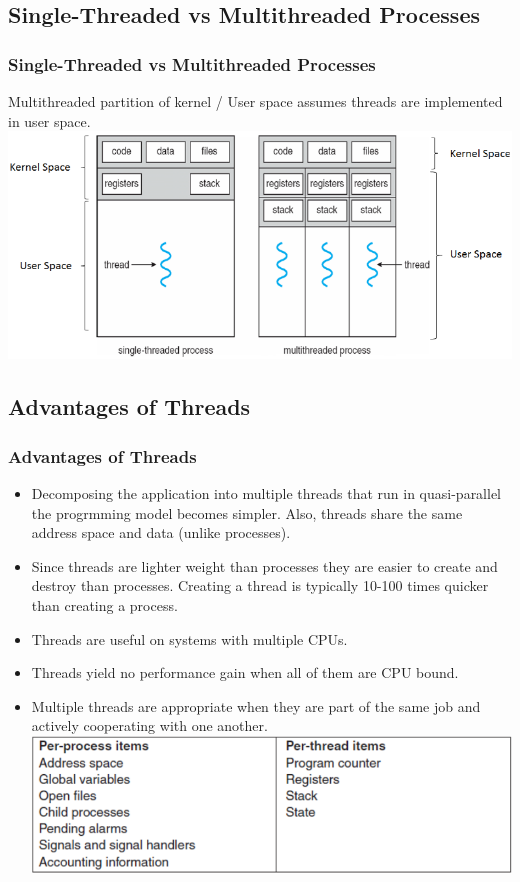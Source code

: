\documentclass{beamer}
\begin{document}
\subsection{Single-Threaded vs Multithreaded Processes}
\begin{frame}
\frametitle{Single-Threaded vs Multithreaded Processes}
Multithreaded partition of kernel / User space assumes threads are implemented in user space.
\includegraphics[scale=0.45]{thread.png}
\end{frame}
\subsection{Advantages of Threads}
\begin{frame}
\frametitle{Advantages of Threads}
\begin{itemize}
\item Decomposing the application into multiple threads that run in quasi-parallel the progrmming model becomes simpler. Also, threads share the same address space and data (unlike processes).
\item Since threads are lighter weight than processes they are easier to create and destroy than processes. Creating a thread is typically 10-100 times quicker than creating a process.
\item Threads are useful on systems with multiple CPUs.
\item Threads yield no performance gain when all of them are CPU bound.
\item Multiple threads are appropriate when they are part of the same job and actively cooperating with one another.
\includegraphics[scale=0.2]{adv.png}
\end{itemize}
\end{frame}
\end{document}
